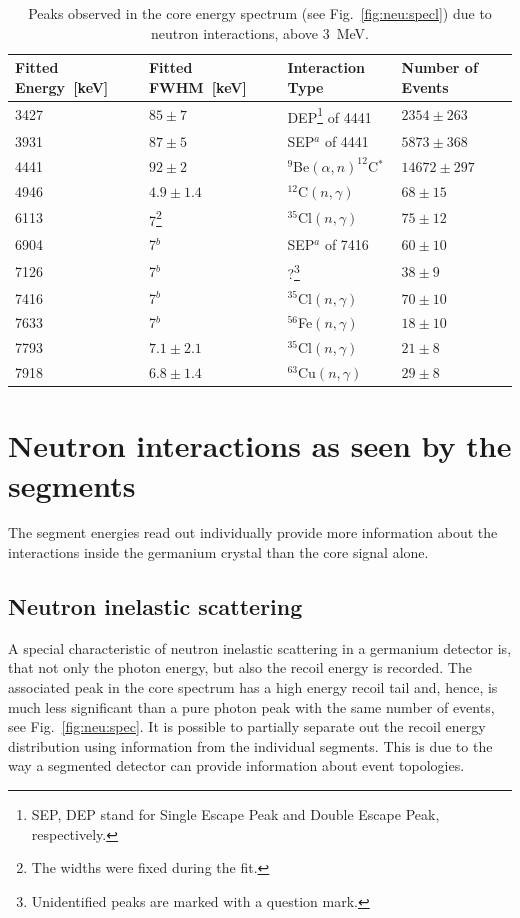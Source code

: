 \begin{table}[tbhp]
\centering
\caption{Peaks observed in the core energy spectrum (see Fig.~\ref{fig:neu:specl}) due to neutron interactions, above 3~MeV.} 
\label{tab:neu:peak2}
\begin{minipage}{\linewidth}\centering
\begin{tabular*}{\textwidth}{llll} \hline\noalign{\smallskip}
Fitted Energy~[keV]& Fitted FWHM~[keV]& Interaction Type& Number of Events\\\hline
3427 & $85 \pm 7$ & DEP\footnote{SEP, DEP stand for Single Escape Peak and Double Escape Peak, respectively.} of 4441 & $2354 \pm 263$ \\
3931 & $87 \pm 5$  & SEP$^a$ of 4441 & $5873 \pm 368$ \\
4441 & $92 \pm 2$  & $^{9}$Be$(\alpha,n)^{12}$C$^{*}$ & $14672 \pm 297$ \\
4946 & $4.9\pm1.4$ & $^{12}$C$(n,\gamma)$            & $68 \pm 15$     \\
6113 & 7\footnote{The widths were fixed during the fit.} & $^{35}$Cl$(n,\gamma)$ & $75 \pm 12$ \\
6904 & 7$^b$      & SEP$^a$ of 7416            & $60 \pm 10$ \\
7126 & 7$^b$ & ?\footnote{Unidentified peaks are marked with a question mark.} & $38 \pm  9$ \\
7416 & 7$^b$       & $^{35}$Cl$(n,\gamma)$ & $70 \pm 10$ \\
7633 & 7$^b$       & $^{56}$Fe$(n,\gamma)$ & $18 \pm 10$ \\
7793 & $7.1\pm2.1$ & $^{35}$Cl$(n,\gamma)$ & $21 \pm  8$ \\
7918 & $6.8\pm1.4$ & $^{63}$Cu$(n,\gamma)$ & $29 \pm  8$ \\
\end{tabular*}
\end{minipage}
\end{table}

\section{Neutron interactions as seen by the segments}
\label{sec:neu:seg}
The segment energies read out individually provide more information about the interactions inside the germanium crystal than the core signal alone.

\subsection{Neutron inelastic scattering}
A special characteristic of neutron inelastic scattering in a germanium detector is, that not only the photon energy, but also the recoil energy is recorded. The associated peak in the core spectrum has a high energy recoil tail and, hence, is much less significant than a pure photon peak with the same number of events, see Fig.~\ref{fig:neu:spec}. It is possible to partially separate out the recoil energy distribution using information from the individual segments. This is due to the way a segmented detector can provide information about event topologies.

